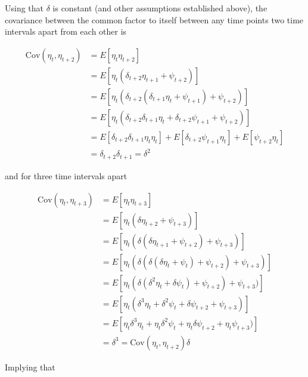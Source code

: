 \documentclass[
  letterpaper,
  DIV=11,
  numbers=noendperiod]{scrartcl}
\begin{document}
Using that \(\delta\) is constant (and other assumptions established
above), the covariance between the common factor to itself between any
time points two time intervals apart from each other is

\[
\begin{align*}
\text{Cov}(\eta_t,\eta_{t+2})&=E[\eta_{t}\eta_{t+2}]\\
&=E[\eta_{t}  (\delta_{t+2}\eta_{t+1}+\psi_{t+2})  ]\\
&=E[\eta_{t}  (\delta_{t+2}(\delta_{t+1}\eta_{t}+\psi_{t+1})+\psi_{t+2})  ]\\
&=E[\eta_{t}  (\delta_{t+2}\delta_{t+1}\eta_{t}+\delta_{t+2}\psi_{t+1}+\psi_{t+2})  ]\\
&=E[\delta_{t+2}\delta_{t+1}\eta_{t}\eta_{t}]+E[\delta_{t+2}\psi_{t+1}\eta_{t}]+E[\psi_{t+2}\eta_{t}]\\
&=\delta_{t+2}\delta_{t+1}=\delta^2
\end{align*}
\]

and for three time intervals apart

\[
\begin{align*}
\text{Cov}(\eta_t,\eta_{t+3})&=E[\eta_{t}\eta_{t+3}]\\
&=E[\eta_{t}  (\delta\eta_{t+2}+\psi_{t+3})  ]\\
&=E[\eta_{t}  (\delta(\delta\eta_{t+1}+\psi_{t+2})+\psi_{t+3})  ]\\
&=E[\eta_{t}  (\delta(\delta(\delta\eta_{t}+\psi_t)+\psi_{t+2})+\psi_{t+3})  ]\\
&=E[\eta_{t}  (\delta(\delta^2\eta_{t}+\delta\psi_t)+\psi_{t+2})+\psi_{t+3})  ]\\
&=E[\eta_{t}  (\delta^3\eta_{t}+\delta^2\psi_t+\delta\psi_{t+2}+\psi_{t+3})  ]\\
&=E[\eta_{t}\delta^3\eta_{t}+\eta_{t}\delta^2\psi_t+\eta_{t}\delta\psi_{t+2}+\eta_{t}\psi_{t+3})  ]\\
&=\delta^3=\text{Cov}(\eta_t,\eta_{t+2})\delta
\end{align*}
\]

Implying that
\end{document}
